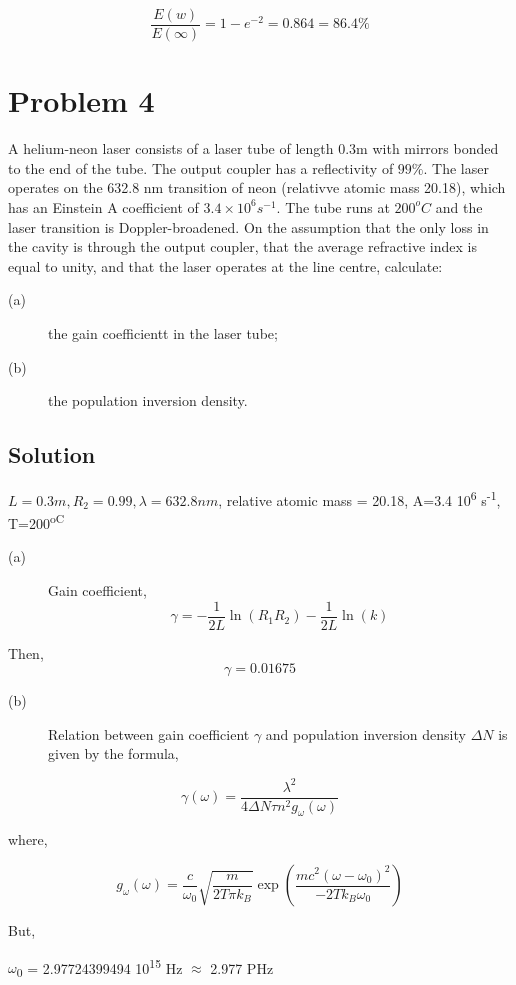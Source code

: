 \documentclass[a4paper,11pt]{article}
\begin{document}
$$\frac{E(w)}{E(\infty)} = 1-e^{-2}=0.864 = 86.4\%$$
\newpage
\section*{Problem 4}
\label{sec:org3c7d930}
A helium-neon laser consists of a laser tube of length 0.3m with mirrors bonded to the end of the tube. The output coupler has a reflectivity of \(99\%\). The laser operates on the 632.8 nm transition of neon (relativve atomic mass 20.18), which has an Einstein A coefficient of \(3.4\times 10^6s^{-1}\). The tube runs at \(200^oC\) and the laser transition is Doppler-broadened. On the assumption that the only loss in the cavity is through the output coupler, that the average refractive index is equal to unity, and that the laser operates at the line centre, calculate:
\begin{description}
\item[{(a)}] the gain coefficientt in the laser tube;
\item[{(b)}] the population inversion density.
\end{description}
\subsection*{Solution}
\label{sec:org0209914}
\(L=0.3m, R_2=0.99, \lambda = 632.8nm\), relative atomic mass = 20.18, A=3.4\texttimes{} 10\textsuperscript{6} s\textsuperscript{-1}, T=200\textsuperscript{oC}
\begin{description}
\item[{(a)}] Gain coefficient, $$\gamma=-\frac{1}{2L}\ln(R_1R_2)-\frac{1}{2L}\ln(k)$$
\end{description}
Then,
$$\gamma = 0.01675$$
\begin{description}
\item[{(b)}] Relation between gain coefficient \(\gamma\) and population inversion density \(\Delta N\) is given by the formula,
\end{description}

$$\gamma(\omega) 
  = \frac{\lambda^2}{4 \Delta N \tau n^2 g_{\omega}(\omega)}$$

where,

$$g_\omega(\omega) = \frac{c}{\omega_0} \sqrt{\frac{m}{2 T \pi k_B}} \exp\left( \frac{mc^2 (\omega - \omega_0)^2}{-2 T k_B \omega_0} \right)$$

But,

\(\omega\)\textsubscript{0} =  2.97724399494\texttimes{} 10\textsuperscript{15} Hz \(\approx\) 2.977 PHz
\end{document}
